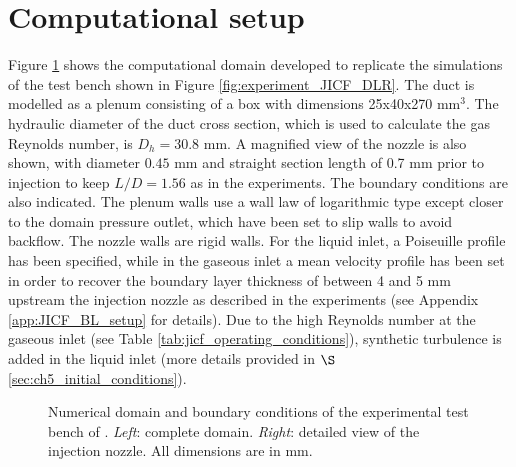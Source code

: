 \section{Computational setup}
	\label{sec:computational_setup}


Figure \ref{fig:numerical_setup_maquette_JICF_DLR} shows the computational domain developed to replicate the simulations of the test bench shown in Figure \ref{fig:experiment_JICF_DLR}. The duct is modelled as a plenum consisting of a box with dimensions 25x40x270 mm$^3$. The hydraulic diameter of the duct cross section, which is used to calculate the gas Reynolds number, is $D_h = 30.8$ mm. A magnified view of the nozzle is also shown, with diameter $0.45$ mm and straight section length of 0.7 mm prior to injection to keep $L/D = 1.56$ as in the experiments. The boundary conditions are also indicated. The plenum walls use a wall law of logarithmic type except closer to the domain pressure outlet, which have been set to slip walls to avoid backflow. The nozzle walls are rigid walls. For the liquid inlet, a Poiseuille profile has been specified, while in the gaseous inlet a mean velocity profile has been set in order to recover the boundary layer thickness of between 4 and 5 mm upstream the injection nozzle as described in the experiments (see Appendix \ref{app:JICF_BL_setup} for details). Due to the high Reynolds number at the gaseous inlet (see Table \ref{tab:jicf_operating_conditions}), synthetic turbulence is added in the liquid inlet (more details provided in $\S$\ref{sec:ch5_initial_conditions}).

\begin{figure}[ht]
     \centering
      \caption{Numerical domain and boundary conditions of the experimental test bench of . \textsl{Left}: complete domain. \textsl{Right}: detailed view of the injection nozzle. All dimensions are in mm.}
      \label{fig:numerical_setup_maquette_JICF_DLR}
\end{figure}

